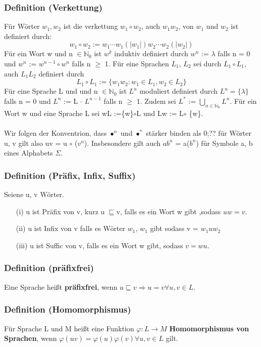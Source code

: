 \documentclass[a4paper,11pt]{article}
\begin{document}
\subsubsection{Definition (Verkettung)}
Für Wörter $w_{1}, w_{2}$ ist die verkettung  $w_{1} \circ w_{2}$, auch $w_{1}w_{2}$, von $w_{1}$ und $w_{2}$ ist definiert durch:
\[w_{1} \circ w_{2} := w_{1} \cdots w_{1} (\lvert w_{1} \rvert)w_{2} \cdots w_{2} (\lvert w_{2} \rvert)\]
Für ein Wort w und n $\in \mathbb{N}_{0}$ ist $w^{k}$ induktiv definiert durch $w^{n}$ := $\lambda$ falls n = 0 und $w^{n}$ := $w^{n-1} \circ w^{n}$ falls n $\geq $ 1. Für eine Sprachen $L_{1}$, $L_{2}$ sei durch $L_{1} \circ L_{1}$, auch $L_{1}L_{2}$ definiert durch
\[L_{1} \circ L_{1} := \{w_{1}w_{2} : w_{1} \in L_{1}, w_{2} \in L_{2}\}\]
Für eine Sprache L und und n $\in\mathbb{N}_{0}$ ist $L^{n}$ moduliert definiert durch $L^{n} = \{\lambda\}$ falls n = 0 und $L^{n}$ := L $\cdot$ $L^{n - 1}$ falls n $\geq$ 1. Zudem sei $L^{*}$ := $\bigcup \limits_{n \in \mathbb{N}_{0}}L^{n}$. Für ein Wort w und eine Sprache L sei wL :=\{w\}$\circ$L und Lw := L$\circ$ \{w\}.\\\\Wir folgen der Konventrion, dass $\bullet^{n}$ und $\bullet^{*}$ stärker binden als 0;?? für Wörter u, v gilt also uv = u $\circ$ ($v^{n}$). Insbesondere gilt auch $ab^{n}$ = a($b^{n}$) für Symbole a, b eines Alphabets $\Sigma$.

\subsubsection{Definition (Präfix, Infix, Suffix)}
Seiene u, v Wörter.
\begin{itemize}
    \item [(i)] u ist Präfix von v, kurz u $\sqsubseteq $v, falls es ein Wort w gibt ,sodass $uw = v$.
    \item [(ii)] u ist Infix von v falls es Wörter $w_{1}$, $w_{1}$ gibt sodass v = $w_{1} u w_{2}$
    \item [(iii)] u ist Suffic von v, falls es ein Wort w gibt, sodass $v = wu$.
\end{itemize}

\subsubsection{Definition (präfixfrei)}
Eine Sprache heißt \textbf{präfixfrei}, wenn $u\sqsubseteq v \Rightarrow u = v \forall u,v \in L$.

\subsubsection{Definition (Homomorphismus)}
Für Sprache L und M heißt eine Funktion $\varphi : L \rightarrow M$ \textbf{Homomorphismus von Sprachen}, wenn $\varphi(uv) = \varphi (u) \varphi (v) \forall u, v \in L$ gilt.
\end{document}
